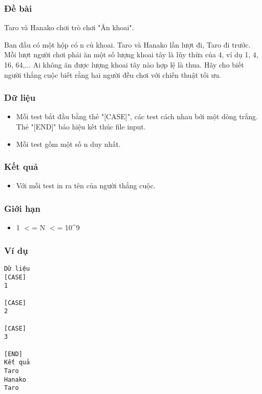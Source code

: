 



\subsubsection{   Đề bài  }

   Taro và Hanako chơi trò chơi "Ăn khoai".  

   Ban đầu có một hộp có n củ khoai. Taro và Hanako lần lượt đi, Taro đi trước. Mỗi lượt người chơi phải ăn một số lượng khoai tây là lũy thừa của 4, ví dụ 1, 4, 16, 64,... Ai không ăn được lượng khoai tây nào hợp lệ là thua. Hãy cho biết người thắng cuộc biết rằng hai người đều chơi với chiến thuật tối ưu.  

\subsubsection{   Dữ liệu  }
\begin{itemize}
	\item     Mỗi test bắt đầu bằng thẻ "[CASE]", các test cách nhau bởi một dòng trắng. Thẻ "[END]" báo hiệu kết thúc file input.   
	\item     Mỗi test gồm một số n duy nhất.   
\end{itemize}

\subsubsection{   Kết quả  }
\begin{itemize}
	\item     Với mỗi test in ra tên của người thắng cuộc.   
\end{itemize}

\subsubsection{   Giới hạn  }
\begin{itemize}
	\item     1 $<$= N $<$= 10\textasciicircum9   
\end{itemize}

\subsubsection{   Ví dụ  }
\begin{verbatim}
Dữ liệu
[CASE]
1

[CASE]
2

[CASE]
3

[END]
Kết quả
Taro
Hanako
Taro
\end{verbatim}